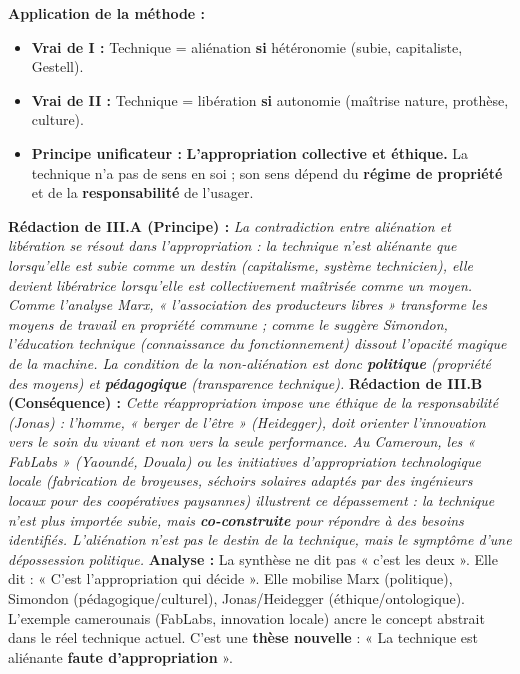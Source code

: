 \documentclass[11pt]{article}
\begin{document}
\begin{exoresolu}
\textbf{Application de la méthode :}
\begin{itemize}
    \item \textbf{Vrai de I :} Technique = aliénation \textbf{si} hétéronomie (subie, capitaliste, Gestell).
    \item \textbf{Vrai de II :} Technique = libération \textbf{si} autonomie (maîtrise nature, prothèse, culture).
    \item \textbf{Principe unificateur :} \textbf{L'appropriation collective et éthique.} La technique n'a pas de sens en soi ; son sens dépend du \textbf{régime de propriété} et de la \textbf{responsabilité} de l'usager.
\end{itemize}
\textbf{Rédaction de III.A (Principe) :}
\emph{La contradiction entre aliénation et libération se résout dans l'appropriation : la technique n'est aliénante que lorsqu'elle est subie comme un destin (capitalisme, système technicien), elle devient libératrice lorsqu'elle est collectivement maîtrisée comme un moyen. Comme l'analyse Marx, « l'association des producteurs libres » transforme les moyens de travail en propriété commune ; comme le suggère Simondon, l'éducation technique (connaissance du fonctionnement) dissout l'opacité magique de la machine. La condition de la non-aliénation est donc \textbf{politique} (propriété des moyens) et \textbf{pédagogique} (transparence technique).}
\textbf{Rédaction de III.B (Conséquence) :}
\emph{Cette réappropriation impose une éthique de la responsabilité (Jonas) : l'homme, « berger de l'être » (Heidegger), doit orienter l'innovation vers le soin du vivant et non vers la seule performance. Au Cameroun, les « FabLabs » (Yaoundé, Douala) ou les initiatives d'appropriation technologique locale (fabrication de broyeuses, séchoirs solaires adaptés par des ingénieurs locaux pour des coopératives paysannes) illustrent ce dépassement : la technique n'est plus importée subie, mais \textbf{co-construite} pour répondre à des besoins identifiés. L'aliénation n'est pas le destin de la technique, mais le symptôme d'une dépossession politique.}
\tcblower
\textbf{Analyse :} La synthèse ne dit pas « c'est les deux ». Elle dit : « C'est l'appropriation qui décide ». Elle mobilise Marx (politique), Simondon (pédagogique/culturel), Jonas/Heidegger (éthique/ontologique). L'exemple camerounais (FabLabs, innovation locale) ancre le concept abstrait dans le réel technique actuel. C'est une \textbf{thèse nouvelle} : « La technique est aliénante \textbf{faute d'appropriation} ».
\end{exoresolu}
\end{document}
